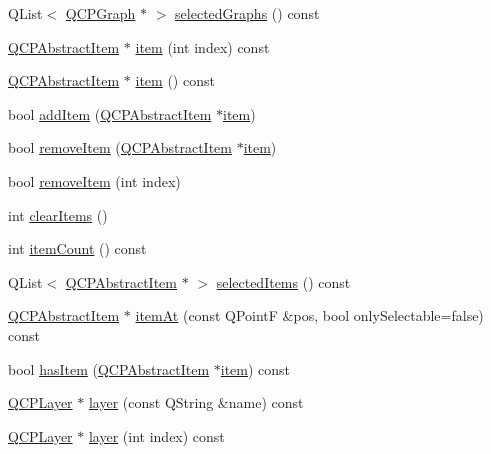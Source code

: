 \begin{DoxyCompactItemize}
Q\+List$<$ \hyperlink{class_q_c_p_graph}{Q\+C\+P\+Graph} $\ast$ $>$ \hyperlink{class_q_custom_plot_ad3547aded026d8a9ae6ef13a69080d06}{selected\+Graphs} () const
\item 
\hyperlink{class_q_c_p_abstract_item}{Q\+C\+P\+Abstract\+Item} $\ast$ \hyperlink{class_q_custom_plot_ac042f2e78edd228ccf2f26b7fe215239}{item} (int index) const
\item 
\hyperlink{class_q_c_p_abstract_item}{Q\+C\+P\+Abstract\+Item} $\ast$ \hyperlink{class_q_custom_plot_a12eb2a283cf10a8a9176c01c0443e83e}{item} () const
\item 
bool \hyperlink{class_q_custom_plot_aa500620379262321685cb7a7674cbd2a}{add\+Item} (\hyperlink{class_q_c_p_abstract_item}{Q\+C\+P\+Abstract\+Item} $\ast$\hyperlink{class_q_custom_plot_ac042f2e78edd228ccf2f26b7fe215239}{item})
\item 
bool \hyperlink{class_q_custom_plot_ae04446557292551e8fb6e2c106e1848d}{remove\+Item} (\hyperlink{class_q_c_p_abstract_item}{Q\+C\+P\+Abstract\+Item} $\ast$\hyperlink{class_q_custom_plot_ac042f2e78edd228ccf2f26b7fe215239}{item})
\item 
bool \hyperlink{class_q_custom_plot_abcfdda3d601c0441cab136137d715dea}{remove\+Item} (int index)
\item 
int \hyperlink{class_q_custom_plot_abdfd07d4f0591d0cf967f85013fd3645}{clear\+Items} ()
\item 
int \hyperlink{class_q_custom_plot_a16025daf0341f9362be3080e404424c2}{item\+Count} () const
\item 
Q\+List$<$ \hyperlink{class_q_c_p_abstract_item}{Q\+C\+P\+Abstract\+Item} $\ast$ $>$ \hyperlink{class_q_custom_plot_afda487bcf2d6cf1a57173d82495e29ba}{selected\+Items} () const
\item 
\hyperlink{class_q_c_p_abstract_item}{Q\+C\+P\+Abstract\+Item} $\ast$ \hyperlink{class_q_custom_plot_ac08578e0e6c059c83a8d340ba0038e8e}{item\+At} (const Q\+PointF \&pos, bool only\+Selectable=false) const
\item 
bool \hyperlink{class_q_custom_plot_af0b57f35646079f93fa6161a65b36109}{has\+Item} (\hyperlink{class_q_c_p_abstract_item}{Q\+C\+P\+Abstract\+Item} $\ast$\hyperlink{class_q_custom_plot_ac042f2e78edd228ccf2f26b7fe215239}{item}) const
\item 
\hyperlink{class_q_c_p_layer}{Q\+C\+P\+Layer} $\ast$ \hyperlink{class_q_custom_plot_a0a96244e7773b242ef23c32b7bdfb159}{layer} (const Q\+String \&name) const
\item 
\hyperlink{class_q_c_p_layer}{Q\+C\+P\+Layer} $\ast$ \hyperlink{class_q_custom_plot_acbb570f4c24306e7c2324d40bfe157c2}{layer} (int index) const

\end{DoxyCompactItemize}
